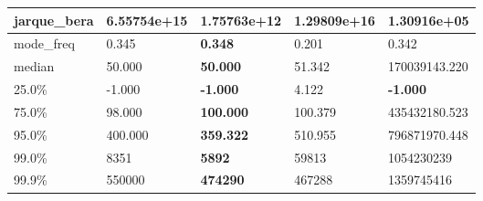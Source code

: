 \begin{table}[H]
\begin{tabular}{|l|m{10em}|m{10em}|m{10em}|m{10em}|}
\hline jarque\_bera & 6.55754e+15 & 1.75763e+12 & \bfseries 1.29809e+16 & \cellcolor[rgb]{0.9, 0.54, 0.52} 1.30916e+05 \\
\hline mode\_freq & 0.345 & \bfseries 0.348 & \cellcolor[rgb]{0.9, 0.54, 0.52} 0.201 & 0.342 \\
\hline median & 50.000 & \bfseries 50.000 & 51.342 & \cellcolor[rgb]{0.9, 0.54, 0.52} 170039143.220 \\
\hline 25.0\% & -1.000 & \bfseries -1.000 & \cellcolor[rgb]{0.9, 0.54, 0.52} 4.122 & \bfseries -1.000 \\
\hline 75.0\% & 98.000 & \bfseries 100.000 & 100.379 & \cellcolor[rgb]{0.9, 0.54, 0.52} 435432180.523 \\
\hline 95.0\% & 400.000 & \bfseries 359.322 & 510.955 & \cellcolor[rgb]{0.9, 0.54, 0.52} 796871970.448 \\
\hline 99.0\% & 8351 & \bfseries 5892 & 59813 & \cellcolor[rgb]{0.9, 0.54, 0.52} 1054230239 \\
\hline 99.9\% & 550000 & \bfseries 474290 & 467288 & \cellcolor[rgb]{0.9, 0.54, 0.52} 1359745416 \\
\hline
\end{tabular}
\end{table}

